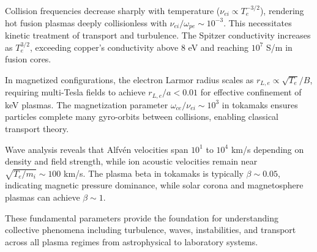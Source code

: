 \documentclass[11pt,a4paper]{article}
\begin{document}
Collision frequencies decrease sharply with temperature ($\nu_{ei} \propto T_e^{-3/2}$), rendering hot fusion plasmas deeply collisionless with $\nu_{ei}/\omega_{pe} \sim 10^{-3}$. This necessitates kinetic treatment of transport and turbulence. The Spitzer conductivity increases as $T_e^{3/2}$, exceeding copper's conductivity above 8 eV and reaching $10^7$ S/m in fusion cores.

In magnetized configurations, the electron Larmor radius scales as $r_{L,e} \propto \sqrt{T_e}/B$, requiring multi-Tesla fields to achieve $r_{L,e}/a < 0.01$ for effective confinement of keV plasmas. The magnetization parameter $\omega_{ce}/\nu_{ei} \sim 10^{3}$ in tokamaks ensures particles complete many gyro-orbits between collisions, enabling classical transport theory.

Wave analysis reveals that Alfvén velocities span $10^{1}$ to $10^{4}$ km/s depending on density and field strength, while ion acoustic velocities remain near $\sqrt{T_e/m_i} \sim 100$ km/s. The plasma beta in tokamaks is typically $\beta \sim 0.05$, indicating magnetic pressure dominance, while solar corona and magnetosphere plasmas can achieve $\beta \sim 1$.

These fundamental parameters provide the foundation for understanding collective phenomena including turbulence, waves, instabilities, and transport across all plasma regimes from astrophysical to laboratory systems.
\end{document}
